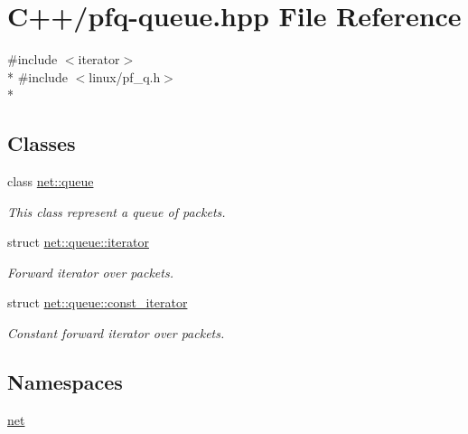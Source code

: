 \hypertarget{pfq-queue_8hpp}{\section{C++/pfq-\/queue.hpp File Reference}
\label{pfq-queue_8hpp}
}
{\ttfamily \#include $<$iterator$>$}\\*
{\ttfamily \#include $<$linux/pf\+\_\+q.\+h$>$}\\*
\subsection*{Classes}
\begin{DoxyCompactItemize}
\item 
class \hyperlink{classnet_1_1queue}{net\+::queue}
\begin{DoxyCompactList}\small\item\em This class represent a queue of packets. \end{DoxyCompactList}\item 
struct \hyperlink{structnet_1_1queue_1_1iterator}{net\+::queue\+::iterator}
\begin{DoxyCompactList}\small\item\em Forward iterator over packets. \end{DoxyCompactList}\item 
struct \hyperlink{structnet_1_1queue_1_1const__iterator}{net\+::queue\+::const\+\_\+iterator}
\begin{DoxyCompactList}\small\item\em Constant forward iterator over packets. \end{DoxyCompactList}\end{DoxyCompactItemize}
\subsection*{Namespaces}
\begin{DoxyCompactItemize}
\item 
 \hyperlink{namespacenet}{net}
\end{DoxyCompactItemize}

